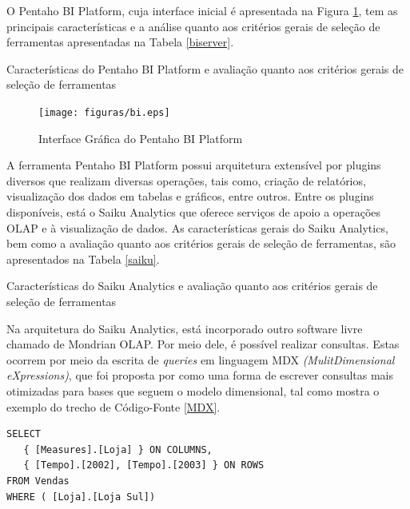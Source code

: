 O Pentaho BI Platform, cuja interface inicial é apresentada na Figura \ref{BIplatform}, tem as principais características e a análise quanto aos critérios gerais de seleção de ferramentas apresentadas na Tabela \ref{biserver}. 


\begin{table}[!ht]

\caption{Características do Pentaho BI Platform e avaliação quanto aos critérios gerais de seleção de ferramentas}
\label{biserver}
\end{table}
\FloatBarrier



\begin{figure}[ht!]
\begin{center}
\texttt{[image: figuras/bi.eps]}
\caption{Interface Gráfica do Pentaho BI Platform}
\label{BIplatform}
\end{center}
\end{figure}
\FloatBarrier
 

A ferramenta Pentaho BI Platform possui arquitetura extensível por plugins diversos que realizam diversas operações, tais como, criação de relatórios, visualização dos dados em tabelas e gráficos, entre outros. Entre os plugins disponíveis, está o Saiku Analytics que oferece serviços de apoio a operações OLAP e à visualização de dados. As características gerais do Saiku Analytics, bem como a avaliação quanto aos critérios gerais de seleção de ferramentas, são apresentados na Tabela \ref{saiku}. 

\begin{table}[!ht]

\caption{Características do Saiku Analytics e avaliação quanto aos critérios gerais de seleção de ferramentas}
\label{saiku}
\end{table}
\FloatBarrier

Na arquitetura do Saiku Analytics, está incorporado outro software livre chamado de Mondrian OLAP. Por meio dele, é possível realizar  consultas. Estas ocorrem por meio da escrita de \textit{queries} em linguagem MDX \textit{(MulitDimensional eXpressions)}, que foi proposta por  como uma forma de escrever consultas mais otimizadas para bases que seguem o modelo dimensional, tal como mostra o exemplo do trecho de Código-Fonte \ref{MDX}.


\begin{center}
\begin{minipage}{0.5\textwidth}

\begin{lstlisting}[caption=Exemplo de \textit{Query} em linguagem MDX, label=MDX]
 SELECT
   { [Measures].[Loja] } ON COLUMNS,
   { [Tempo].[2002], [Tempo].[2003] } ON ROWS
FROM Vendas
WHERE ( [Loja].[Loja Sul]) 

\end{lstlisting}
\end{minipage}
\end{center}
\FloatBarrier

